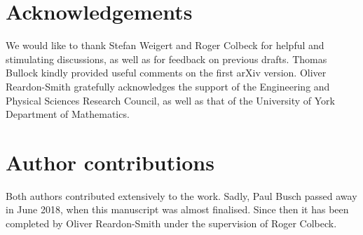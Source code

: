\section*{Acknowledgements}

We would like to thank Stefan Weigert and Roger Colbeck for helpful and stimulating discussions, as well as for feedback on previous drafts. Thomas Bullock kindly provided useful comments on the first arXiv version. Oliver Reardon-Smith gratefully acknowledges the support of the Engineering and Physical Sciences Research Council, as well as that of the University of York Department of Mathematics.

\section*{Author contributions}

Both authors contributed extensively to the work. Sadly, Paul Busch passed away in June 2018, when this manuscript was almost finalised. Since then it has been completed by Oliver Reardon-Smith under the supervision of Roger Colbeck.

\appendix

